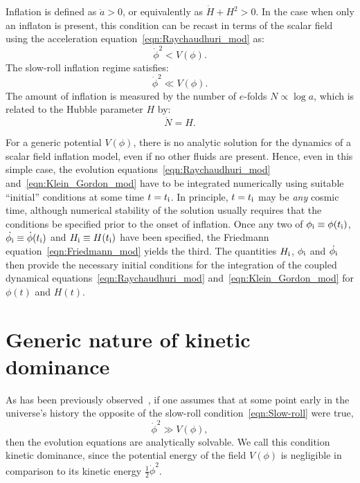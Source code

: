 Inflation is defined as \(\ddot{a}>0\), or equivalently as \(\dot{H}+H^2>0\). In the case when only an inflaton is present, this condition can be recast in terms of the scalar field using the acceleration equation~\eqref{eqn:Raychaudhuri_mod} as:
%
\begin{equation}
  \dot{\phi}^2<V(\phi).
  \label{eqn:Onset_inflation}
\end{equation}
%
The slow-roll inflation regime satisfies:
%
\begin{equation}
  \dot{\phi}^2\ll V(\phi).
  \label{eqn:Slow-roll}
\end{equation}
%
The amount of inflation is measured by the number of \(e\)-folds \(N\propto \log a\), which is related to the Hubble parameter \(H\) by:
%
\begin{equation}
  \dot{N}=H.\label{eqn:e-folds}
\end{equation}
%

For a generic potential \(V(\phi)\), there is no analytic solution for the dynamics of a scalar field inflation model, even if no other fluids are present. Hence, even in this simple case, the evolution equations~\eqref{eqn:Raychaudhuri_mod} and~\eqref{eqn:Klein_Gordon_mod} have to be integrated numerically using suitable ``initial'' conditions at some time \(t=t_{\mathrm{i}}\). In principle, \(t=t_{\mathrm{i}}\) may be {\em any\/} cosmic time, although numerical stability of the solution usually requires that the conditions be specified prior to the onset of inflation.  Once any two of \(\phi_{\mathrm{i}} \equiv \phi(t_{\mathrm{i}})\), \(\dot{\phi_{\mathrm{i}}} \equiv \dot{\phi}(t_{\mathrm{i}})\) and \(H_{\mathrm{i}} \equiv H(t_{\mathrm{i}})\) have been specified, the Friedmann equation~\eqref{eqn:Friedmann_mod} yields the third. The quantities \(H_{\mathrm{i}}\), \(\phi_{\mathrm{i}}\) and \(\dot{\phi_{\mathrm{i}}}\) then provide the necessary initial conditions for the integration of the coupled dynamical equations~\eqref{eqn:Raychaudhuri_mod} and~\eqref{eqn:Klein_Gordon_mod} for \(\phi(t)\) and \(H(t)\).
\section{Generic nature of kinetic dominance}
\label{sec:The_generic_nature_of_kinetic_dominance}

As has been previously observed~\citep{Linde_initial_conditions_1985, belinsky_inflationary_1985,particle_astrophysics_1990}, if one assumes that at some point early in the universe's history the opposite of the slow-roll condition~\eqref{eqn:Slow-roll} were true,
%
\begin{equation}
  \dot\phi^2\gg V(\phi),
  \label{eqn:kddef}
\end{equation}
%
then the evolution equations are analytically solvable.  We call this condition kinetic dominance, since the potential energy of the field \(V(\phi)\) is negligible in comparison to its kinetic energy \(\frac{1}{2}\dot\phi^2\).

